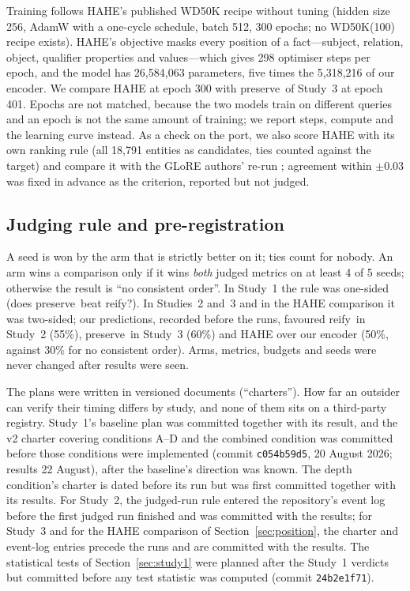 \documentclass[11pt,a4paper]{article}
\newcommand{\hyper}{\textsf{preserve}}
\newcommand{\reif}{\textsf{reify}}
\begin{document}
Training follows HAHE's published WD50K recipe without tuning (hidden size 256, AdamW with a one-cycle schedule, batch 512, 300 epochs; no WD50K(100) recipe exists). HAHE's objective masks every position of a fact---subject, relation, object, qualifier properties and values---which gives 298 optimiser steps per epoch, and the model has 26,584,063 parameters, five times the 5,318,216 of our encoder. We compare HAHE at epoch 300 with \hyper\ of Study~3 at epoch 401. Epochs are not matched, because the two models train on different queries and an epoch is not the same amount of training; we report steps, compute and the learning curve instead. As a check on the port, we also score HAHE with its own ranking rule (all 18,791 entities as candidates, ties counted against the target) and compare it with the GLoRE authors' re-run \citep{ji2026glore}; agreement within $\pm$0.03 was fixed in advance as the criterion, reported but not judged.

\subsection{Judging rule and pre-registration}
\label{sec:judging}

A seed is won by the arm that is strictly better on it; ties count for nobody. An arm wins a comparison only if it wins \emph{both} judged metrics on at least 4 of 5 seeds; otherwise the result is ``no consistent order''. In Study~1 the rule was one-sided (does \hyper\ beat \reif?). In Studies~2 and~3 and in the HAHE comparison it was two-sided; our predictions, recorded before the runs, favoured \reif\ in Study~2 (55\%), \hyper\ in Study~3 (60\%) and HAHE over our encoder (50\%, against 30\% for no consistent order). Arms, metrics, budgets and seeds were never changed after results were seen.

The plans were written in versioned documents (``charters''). How far an outsider can verify their timing differs by study, and none of them sits on a third-party registry. Study~1's baseline plan was committed together with its result, and the v2 charter covering conditions A--D and the combined condition was committed before those conditions were implemented (commit \texttt{c054b59d5}, 20 August 2026; results 22 August), after the baseline's direction was known. The depth condition's charter is dated before its run but was first committed together with its results. For Study~2, the judged-run rule entered the repository's event log before the first judged run finished and was committed with the results; for Study~3 and for the HAHE comparison of Section~\ref{sec:position}, the charter and event-log entries precede the runs and are committed with the results. The statistical tests of Section~\ref{sec:study1} were planned after the Study~1 verdicts but committed before any test statistic was computed (commit \texttt{24b2e1f71}).
\end{document}
